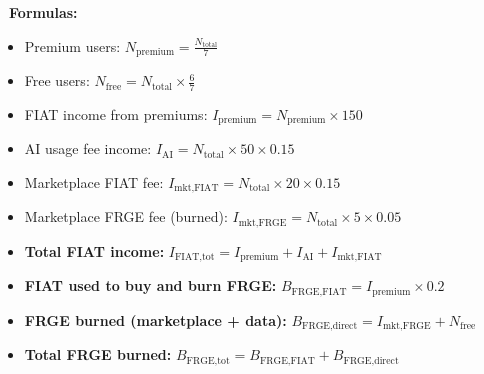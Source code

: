 \textbf{\textcolor{fabPrimary}{\faCalculator\ Formulas:}}

\begin{itemize}[leftmargin=*]
    \item Premium users: $N_{\text{premium}} = \frac{N_{\text{total}}}{7}$
    \item Free users: $N_{\text{free}} = N_{\text{total}} \times \frac{6}{7}$
    \item FIAT income from premiums: $I_{\text{premium}} = N_{\text{premium}} \times 150$
    \item AI usage fee income: $I_{\text{AI}} = N_{\text{total}} \times 50 \times 0.15$
    \item Marketplace FIAT fee: $I_{\text{mkt,FIAT}} = N_{\text{total}} \times 20 \times 0.15$
    \item Marketplace FRGE fee (burned): $I_{\text{mkt,FRGE}} = N_{\text{total}} \times 5 \times 0.05$
    \item \textbf{Total FIAT income:} $I_{\text{FIAT,tot}} = I_{\text{premium}} + I_{\text{AI}} + I_{\text{mkt,FIAT}}$
    \item \textbf{FIAT used to buy and burn FRGE:} $B_{\text{FRGE,FIAT}} = I_{\text{premium}} \times 0.2$
    \item \textbf{FRGE burned (marketplace + data):} $B_{\text{FRGE,direct}} = I_{\text{mkt,FRGE}} + N_{\text{free}}$
    \item \textbf{Total FRGE burned:} $B_{\text{FRGE,tot}} = B_{\text{FRGE,FIAT}} + B_{\text{FRGE,direct}}$
\end{itemize}

